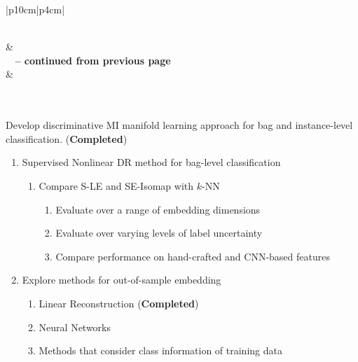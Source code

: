 \begin{longtable}{|p{10cm}|p{4cm}|} 
	\caption[List of research tasks.]{List of research tasks and their corresponding estimated dates for completion.}
	\label{tab:future_tasks}\\
	\hline {} &  \\ \hline
	\endfirsthead
	{{\bfseries \tablename\ \thetable{} -- continued from previous page}} \\
	\hline {} &  
	\\
	\hline
	\endhead
	\hline {} \\ \hline
	\endfoot
	\hline \hline
	\endlastfoot


	 \\
	\hline
	Develop discriminative MI manifold learning approach for bag and instance-level classification.  (\textbf{Completed})
	\begin{enumerate}
		\item Supervised Nonlinear DR method for bag-level classification \label{item:supervisedDR_bag_level}
		\begin{enumerate}
			\item Compare S-LE and SE-Isomap  with $k$-NN
			\begin{enumerate}
				\item Evaluate over a range of embedding dimensions
				\item Evaluate over varying levels of label uncertainty
				\item Compare performance on hand-crafted and CNN-based features
			\end{enumerate}
		\end{enumerate}
	
		\item Explore methods for out-of-sample embedding
		\begin{enumerate}
			\item Linear Reconstruction  (\textbf{Completed})
			\item Neural Networks
			\item Methods that consider class information of training data
		\end{enumerate}
		

\end{enumerate}
\end{longtable}
